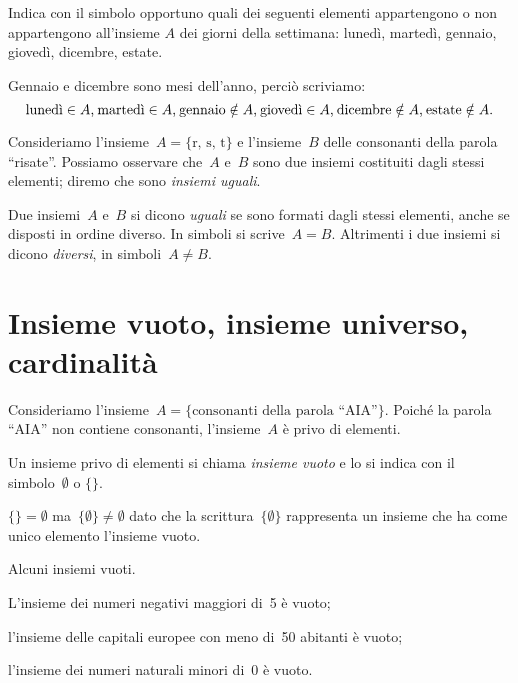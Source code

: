  \begin{exrig}
 \begin{esempio}
Indica con il simbolo opportuno quali dei seguenti elementi appartengono
o non appartengono all'insieme $A$ dei giorni della
settimana: lunedì, martedì, gennaio, giovedì, dicembre, estate.

Gennaio e dicembre sono mesi dell'anno, perciò scriviamo:
\[\text{lunedì}\in A\text{,\:}\text{martedì}\in A\text{,\:}\text{gennaio}\notin A\text{,\:}\text{giovedì}\in A\text{,\:}\text{dicembre}\notin A\text{,\:}\text{estate}\notin A.\]
 \end{esempio}
\end{exrig}

Consideriamo l'insieme~$A=\{\text{r, s, t}\}$ e l'insieme~$B$ delle consonanti della parola
``risate''. Possiamo osservare che~$A$ e~$B$ sono due insiemi costituiti dagli stessi
elementi; diremo che sono \textit{insiemi uguali}.

\begin{definizione}
 Due insiemi~$A$ e~$B$ si dicono \emph{uguali} se sono formati dagli stessi elementi, anche se
disposti in ordine diverso. In simboli si scrive~$A=B$. Altrimenti i due insiemi si dicono \emph{diversi}, in simboli~$A\neq B$.
\end{definizione}

\ovalbox{\risolvii \ref{ese:5.2}, \ref{ese:5.3}, \ref{ese:5.4}, \ref{ese:5.5}, \ref{ese:5.6}, \ref{ese:5.7}, \ref{ese:5.8}, \ref{ese:5.9}}

\section{Insieme vuoto, insieme universo, cardinalità}\label{sect:universo}

Consideriamo l'insieme~$A=\{\text{consonanti della parola ``AIA''}\}$. Poiché la parola ``AIA'' non
contiene consonanti, l'insieme~$A$ è privo di elementi.

\begin{definizione}
 Un insieme privo di elementi si chiama \emph{insieme vuoto} e lo si indica con il simbolo~$\emptyset$ o $\{ \}$.
\end{definizione}

\osservazione $\{ \}=\emptyset$ ma~$\{\emptyset \}\neq\emptyset$ dato che la scrittura~$\{\emptyset \}$ rappresenta un insieme che ha
come unico elemento l'insieme vuoto.

\begin{exrig}
 \begin{esempio}
 Alcuni insiemi vuoti.
 \begin{enumeratea}
  \spazielenx
\item L'insieme dei numeri negativi maggiori di~5 è vuoto;
\item l'insieme delle capitali europee con meno di~50 abitanti è vuoto;
\item l'insieme dei numeri naturali minori di~0 è vuoto.
 \end{enumeratea}
 \end{esempio}
\end{exrig}

